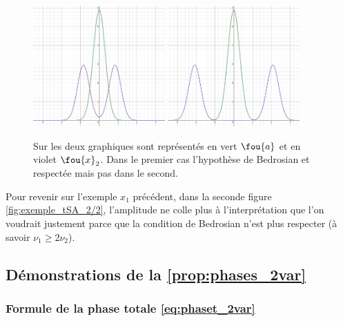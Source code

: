 \begin{figure}[h]\centering
	\includegraphics[width=0.45\textwidth]{fig/part-1/bedro condi 1.png} 
	\hfill
	\includegraphics[width=0.45\textwidth]{fig/part-1/bedro condi 2.png} 
	\caption[Représentation de l'hypothèse du Théorème de Bedrosian]{Sur les deux graphiques sont représentés en vert $\fou{a}$ et en violet $\fou{x}_2$. Dans le premier cas l'hypothèse de Bedrosian et respectée mais pas dans le second.}
	\label{fig:alising-ish}
\end{figure}


Pour revenir sur l'exemple $x_1$ précédent, dans la seconde figure \ref{fig:exemple_tSA_2/2}, l'amplitude ne colle plus à l'interprétation que l'on voudrait justement parce que la condition de Bedrosian n'est plus respecter (à savoir $\nu_1\geq 2\nu_2$). 




\subsection{Démonstrations de la \cref{prop:phases_2var}}\label{ann:demo_phases_2var}

\subsubsection{Formule de la phase totale \eqref{eq:phaset_2var}}

